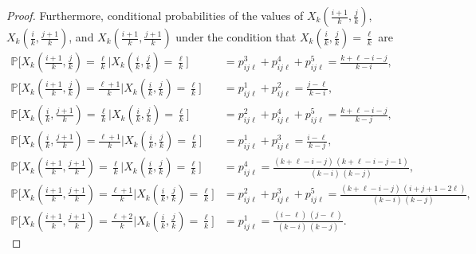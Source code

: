 \documentclass[10pt,a4paper]{amsart}
\newcommand{\PP}{\mathbb{P}}
\begin{document}
\begin{proof}
Furthermore, conditional probabilities of the values of $X_k(\tfrac{i+1}{k},\tfrac{j}{k})$, $X_k(\tfrac{i}{k},\tfrac{j+1}{k})$, and $X_k(\tfrac{i+1}{k},\tfrac{j+1}{k})$ under the condition that $X_k(\tfrac{i}{k},\tfrac{j}{k})  = \tfrac{\ell}{k}$ are
\begin{align*}
   \PP\big[X_k(\tfrac{i+1}{k},\tfrac{j}{k}) = \tfrac{\ell}{k} \big| X_k(\tfrac{i}{k},\tfrac{j}{k}) = \tfrac{\ell}{k}\big] 
   &= p_{ij\ell}^3 + p_{ij\ell}^4 + p_{ij\ell}^5 = \frac{k+\ell-i-j}{k-i}, \\
   \PP\big[X_k(\tfrac{i+1}{k},\tfrac{j}{k}) = \tfrac{\ell+1}{k} \big| X_k(\tfrac{i}{k},\tfrac{j}{k}) = \tfrac{\ell}{k}\big] 
   &= p_{ij\ell}^1 + p_{ij\ell}^2 = \frac{j-\ell}{k-i}, \\
   \PP\big[X_k(\tfrac{i}{k},\tfrac{j+1}{k}) = \tfrac{\ell}{k} \big| X_k(\tfrac{i}{k},\tfrac{j}{k}) = \tfrac{\ell}{k}\big] 
   &= p_{ij\ell}^2 + p_{ij\ell}^4 + p_{ij\ell}^5 = \frac{k+\ell-i-j}{k-j}, \\
   \PP\big[X_k(\tfrac{i}{k},\tfrac{j+1}{k}) = \tfrac{\ell+1}{k} \big| X_k(\tfrac{i}{k},\tfrac{j}{k}) = \tfrac{\ell}{k}\big] 
   &= p_{ij\ell}^1 + p_{ij\ell}^3 = \frac{i-\ell}{k-j}, \\
   \PP\big[X_k(\tfrac{i+1}{k},\tfrac{j+1}{k}) = \tfrac{\ell}{k} \big| X_k(\tfrac{i}{k},\tfrac{j}{k}) = \tfrac{\ell}{k}\big] 
   &= p_{ij\ell}^4 = \frac{(k+\ell-i-j) \, (k+\ell-i-j-1)}{(k-i) \, (k-j)}, \\
   \PP\big[X_k(\tfrac{i+1}{k},\tfrac{j+1}{k}) = \tfrac{\ell+1}{k} \big| X_k(\tfrac{i}{k},\tfrac{j}{k}) = \tfrac{\ell}{k}\big] 
   &= p_{ij\ell}^2 + p_{ij\ell}^3 + p_{ij\ell}^5 = \frac{(k+\ell-i-j) \, (i+j+1-2\ell)}{(k-i) \, (k-j)}, \\
   \PP\big[X_k(\tfrac{i+1}{k},\tfrac{j+1}{k}) = \tfrac{\ell+2}{k} \big| X_k(\tfrac{i}{k},\tfrac{j}{k}) = \tfrac{\ell}{k}\big] 
   &= p_{ij\ell}^1 = \frac{(i-\ell) \, (j-\ell)}{(k-i) \, (k-j)}.
\end{align*}


\end{proof}
\end{document}
